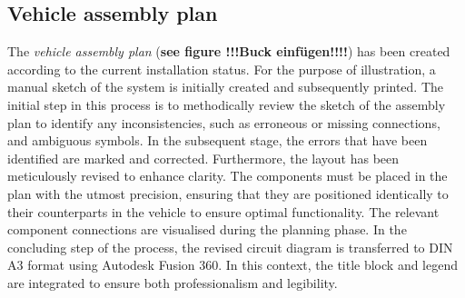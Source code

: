 \subsection{Vehicle assembly plan}
The \textit{vehicle assembly plan} (\textbf{see figure !!!Buck einfügen!!!!\underline{}}) has been created according to the current installation status. For the purpose of illustration, a manual sketch of the system is initially created and subsequently printed. The initial step in this process is to methodically review the sketch of the assembly plan to identify any inconsistencies, such as erroneous or missing connections, and ambiguous symbols. In the subsequent stage, the errors that have been identified are marked and corrected. Furthermore, the layout has been meticulously revised to enhance clarity. The components must be placed in the plan with the utmost precision, ensuring that they are positioned identically to their counterparts in the vehicle to ensure optimal functionality. The relevant component connections are visualised during the planning phase. In the concluding step of the process, the revised circuit diagram is transferred to DIN A3 format using Autodesk Fusion 360. In this context, the title block and legend are integrated to ensure both professionalism and legibility.
